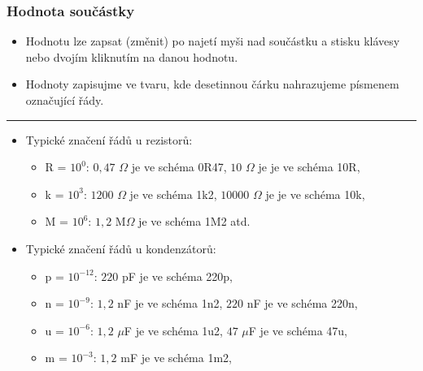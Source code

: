 \documentclass{beamer}
\begin{document}
\begin{frame}
	\frametitle{Hodnota součástky}
	
	\begin{itemize}
		\item Hodnotu lze zapsat (změnit) po najetí myši nad součástku a stisku klávesy  nebo dvojím kliknutím na danou hodnotu.
		\item Hodnoty zapisujme ve tvaru, kde desetinnou čárku nahrazujeme písmenem označující řády.
	\end{itemize}
	
	\hrule
	
	\begin{itemize}
		\item Typické značení řádů u rezistorů:
		
		\begin{itemize}
			\item R = $10^0$: $0,47$ $\Omega$ je ve schéma 0R47, $10$ $\Omega$ je je ve schéma 10R,
			\item k = $10^3$: $1200$ $\Omega$ je ve schéma 1k2, $10000$ $\Omega$ je je ve schéma 10k,
			\item M = $10^6$: $1,2$ M$\Omega$ je ve schéma 1M2 atd.
		\end{itemize}
		
		\item Typické značení řádů u kondenzátorů:
		
		\begin{itemize}
			\item p = $10^{-12}$: $220$ pF je ve schéma 220p,
			\item n = $10^{-9}$: $1,2$ nF je ve schéma 1n2, $220$ nF je ve schéma 220n,
			\item u = $10^{-6}$: $1,2$ $\mu$F je ve schéma 1u2, $47$ $\mu$F je ve schéma 47u,
			\item m = $10^{-3}$: $1,2$ mF je ve schéma 1m2,
		\end{itemize}
	\end{itemize}
	
\end{frame}
\end{document}
